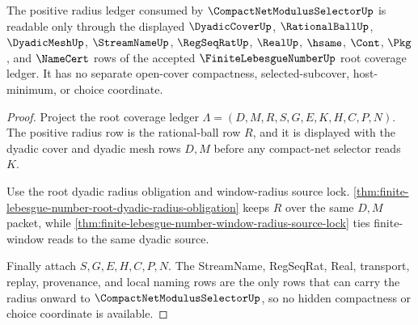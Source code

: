 \begin{theorem}
\label{thm:finite-lebesgue-number-selector-radius-domain}
The positive radius ledger consumed by $\CompactNetModulusSelectorUp$ is readable only through the displayed $\DyadicCoverUp$, $\RationalBallUp$, $\DyadicMeshUp$, $\StreamNameUp$, $\RegSeqRatUp$, $\RealUp$, $\hsame$, $\Cont$, $\Pkg$, and $\NameCert$ rows of the accepted $\FiniteLebesgueNumberUp$ root coverage ledger. It has no separate open-cover compactness, selected-subcover, host-minimum, or choice coordinate.
\end{theorem}
\begin{proof}
Project the root coverage ledger $\Lambda=(D,M,R,S,G,E,K,H,C,P,N)$. The positive radius row is the rational-ball row $R$, and it is displayed with the dyadic cover and dyadic mesh rows $D,M$ before any compact-net selector reads $K$.

Use the root dyadic radius obligation and window-radius source lock. \autoref{thm:finite-lebesgue-number-root-dyadic-radius-obligation} keeps $R$ over the same $D,M$ packet, while \autoref{thm:finite-lebesgue-number-window-radius-source-lock} ties finite-window reads to the same dyadic source.

Finally attach $S,G,E,H,C,P,N$. The StreamName, RegSeqRat, Real, transport, replay, provenance, and local naming rows are the only rows that can carry the radius onward to $\CompactNetModulusSelectorUp$, so no hidden compactness or choice coordinate is available.
\end{proof}

